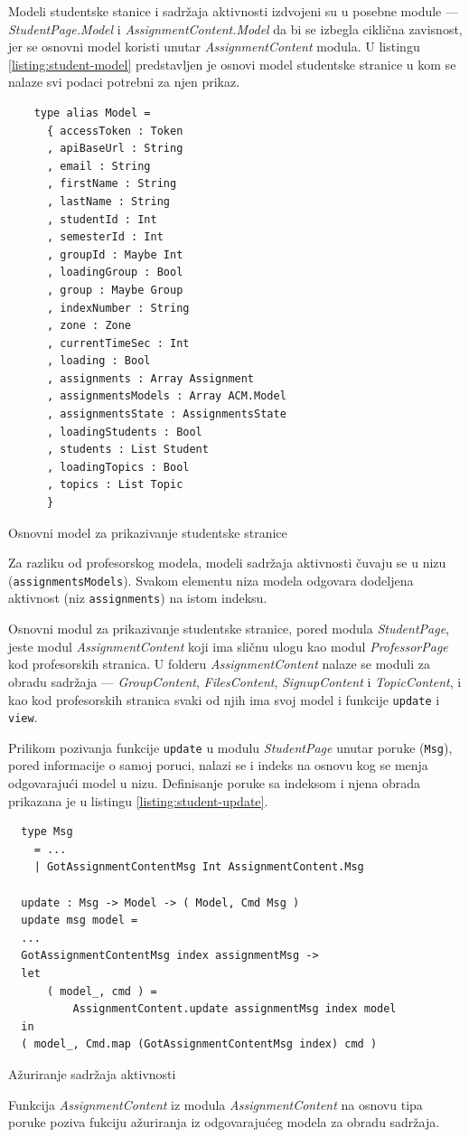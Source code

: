 \documentclass[12pt,oneside]{memoir}
\begin{document}
Modeli studentske stanice i sadržaja aktivnosti izdvojeni su u posebne module --- \emph{StudentPage.Model} i
\emph{AssignmentContent.Model} da bi se izbegla ciklična zavisnost, jer se osnovni model koristi unutar
\emph{AssignmentContent} modula. U listingu \ref{listing:student-model} predstavljen je osnovi model studentske stranice u kom se
nalaze svi podaci potrebni za njen prikaz.
\begin{listing}[h]
\begin{verbatim}
    type alias Model =
      { accessToken : Token
      , apiBaseUrl : String
      , email : String
      , firstName : String
      , lastName : String
      , studentId : Int
      , semesterId : Int
      , groupId : Maybe Int
      , loadingGroup : Bool
      , group : Maybe Group
      , indexNumber : String
      , zone : Zone
      , currentTimeSec : Int
      , loading : Bool
      , assignments : Array Assignment
      , assignmentsModels : Array ACM.Model
      , assignmentsState : AssignmentsState
      , loadingStudents : Bool
      , students : List Student
      , loadingTopics : Bool
      , topics : List Topic
      }
\end{verbatim}
\caption{Osnovni model za prikazivanje studentske stranice}
\label{listing:student-model}
\end{listing}
Za razliku od profesorskog modela, modeli sadržaja aktivnosti čuvaju se u nizu
(\texttt{assignmentsModels}). Svakom elementu niza modela odgovara dodeljena aktivnost (niz \texttt{assignments}) na istom indeksu.

Osnovni modul za prikazivanje studentske stranice, pored modula \emph{StudentPage}, jeste modul
\emph{AssignmentContent} koji ima sličnu ulogu kao modul \emph{ProfessorPage} kod profesorskih
stranica. U folderu \emph{AssignmentContent} nalaze se moduli za obradu sadržaja --- \emph{GroupContent}, \emph{FilesContent},
\emph{SignupContent} i \emph{TopicContent}, i kao kod profesorskih stranica svaki od njih ima svoj
model i funkcije \texttt{update} i \texttt{view}.

Prilikom pozivanja funkcije \texttt{update} u modulu \emph{StudentPage} unutar poruke (\texttt{Msg}), pored informacije o
samoj poruci, nalazi se i indeks na osnovu kog se menja odgovarajući model u nizu. Definisanje poruke sa indeksom i njena
obrada prikazana je u listingu \ref{listing:student-update}.
\begin{listing}[h]
\begin{verbatim}
  type Msg
    = ...
    | GotAssignmentContentMsg Int AssignmentContent.Msg

  update : Msg -> Model -> ( Model, Cmd Msg )
  update msg model =
  ...
  GotAssignmentContentMsg index assignmentMsg ->
  let
      ( model_, cmd ) =
          AssignmentContent.update assignmentMsg index model
  in
  ( model_, Cmd.map (GotAssignmentContentMsg index) cmd )
\end{verbatim}
\caption{Ažuriranje sadržaja aktivnosti}
\label{listing:student-update}
\end{listing}
Funkcija \emph{AssignmentContent} iz modula \emph{AssignmentContent} na osnovu tipa poruke poziva
fukciju ažuriranja iz odgovarajućeg modela za obradu sadržaja.
\end{document}
